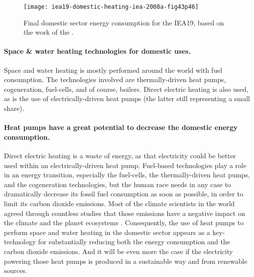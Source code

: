 \begin{figure}[htbp]
  \centering
  \texttt{[image: iea19-domestic-heating-iea-2008a-fig43p46]}
  \caption[Final household energy consumption for the IEA19]
  {Final domestic sector energy consumption for the IEA19, based on
    the work of the \citet[Fig.\,4.3, p.\,46]{iea-2008a}.}
  \label{fig:household-energy-consumption-2005}
\end{figure}

\paragraph{Space \& water heating technologies for domestic uses.}
Space and water heating is mostly performed around the world with fuel
consumption. The technologies involved are thermally-driven heat
pumps, cogeneration,
fuel-cells, and of course, boilers. Direct electric heating is also
used, as is the use of electrically-driven heat pumps (the latter still representing a
small share).

\paragraph{Heat pumps have a great potential to decrease the domestic
  energy consumption.} Direct electric heating is a waste of energy, as
that electricity could be better used within an electrically-driven
heat pump. Fuel-based
technologies play a role in an energy transition, especially the
fuel-cells, the thermally-driven heat pumps, and the cogeneration
technologies, but the human race needs in any case to dramatically
decrease its fossil fuel consumption as soon as possible, in order to limit its carbon
dioxide emissions. Most of the climate
scientists in the world agreed through countless studies that those
emissions have a negative impact on the climate and the planet
ecosystems \citep{IPCC-2014a}. Consequently, the
use of heat pumps to perform space and water heating
in the domestic sector appears as a key-technology for substantially
reducing both the energy consumption and the carbon dioxide
emissions. And it will be even more the case if the electricity
powering those heat pumps is produced in a sustainable way and from
renewable sources.


